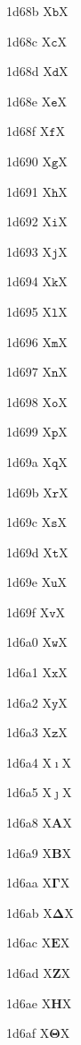 \documentclass[11pt]{article}
\begin{document}
1d68b X{\ensuremath{\mathtt{b}}}X

1d68c X{\ensuremath{\mathtt{c}}}X

1d68d X{\ensuremath{\mathtt{d}}}X

1d68e X{\ensuremath{\mathtt{e}}}X

1d68f X{\ensuremath{\mathtt{f}}}X

1d690 X{\ensuremath{\mathtt{g}}}X

1d691 X{\ensuremath{\mathtt{h}}}X

1d692 X{\ensuremath{\mathtt{i}}}X

1d693 X{\ensuremath{\mathtt{j}}}X

1d694 X{\ensuremath{\mathtt{k}}}X

1d695 X{\ensuremath{\mathtt{l}}}X

1d696 X{\ensuremath{\mathtt{m}}}X

1d697 X{\ensuremath{\mathtt{n}}}X

1d698 X{\ensuremath{\mathtt{o}}}X

1d699 X{\ensuremath{\mathtt{p}}}X

1d69a X{\ensuremath{\mathtt{q}}}X

1d69b X{\ensuremath{\mathtt{r}}}X

1d69c X{\ensuremath{\mathtt{s}}}X

1d69d X{\ensuremath{\mathtt{t}}}X

1d69e X{\ensuremath{\mathtt{u}}}X

1d69f X{\ensuremath{\mathtt{v}}}X

1d6a0 X{\ensuremath{\mathtt{w}}}X

1d6a1 X{\ensuremath{\mathtt{x}}}X

1d6a2 X{\ensuremath{\mathtt{y}}}X

1d6a3 X{\ensuremath{\mathtt{z}}}X

1d6a4 X{\ensuremath{\imath}}X

1d6a5 X{\ensuremath{\jmath}}X

1d6a8 X{\ensuremath{\mathbf{A}}}X

1d6a9 X{\ensuremath{\mathbf{B}}}X

1d6aa X{\ensuremath{\mathbf{\Gamma}}}X

1d6ab X{\ensuremath{\mathbf{\Delta}}}X

1d6ac X{\ensuremath{\mathbf{E}}}X

1d6ad X{\ensuremath{\mathbf{Z}}}X

1d6ae X{\ensuremath{\mathbf{H}}}X

1d6af X{\ensuremath{\mathbf{\Theta}}}X
\end{document}
